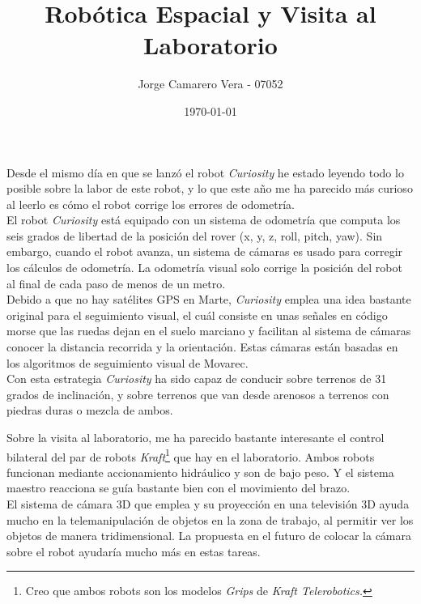 \documentclass[a4paper, fontsize=11pt]{scrartcl} %
\title{	
	\normalfont \normalsize 
	\huge Robótica Espacial y Visita al Laboratorio \\ %
}
\author{Jorge Camarero Vera - 07052} %
\date{\normalsize\today} %
\numberwithin{equation}{section} %
\numberwithin{figure}{section} %
\numberwithin{table}{section} %
\begin{document}
	\maketitle
	
	Desde el mismo día en que se lanzó el robot \textit{Curiosity} he estado leyendo todo lo posible sobre la labor de este robot, y lo que este año me ha parecido más curioso al leerlo es cómo el robot corrige los errores de odometría\cite{CURIOSITY}.\\
	
	El robot \textit{Curiosity} está equipado con un sistema de odometría que computa los seis grados de libertad de la posición del rover (x, y, z, roll, pitch, yaw). Sin embargo, cuando el robot avanza, un sistema de cámaras es usado para corregir los cálculos de odometría. La odometría visual solo corrige la posición del robot al final de cada paso de menos de un metro.\\
	
	Debido a que no hay satélites GPS en Marte, \textit{Curiosity} emplea una idea bastante original para el seguimiento visual, el cuál consiste en unas señales en código morse que las ruedas dejan en el suelo marciano y facilitan al sistema de cámaras conocer la distancia recorrida y la orientación. Estas cámaras están basadas en los algoritmos de seguimiento visual de Movarec\cite{MOVAREC}. \\
	
	Con esta estrategia \textit{Curiosity} ha sido capaz de conducir sobre terrenos de 31 grados de inclinación, y sobre terrenos que van desde arenosos a terrenos con piedras duras o mezcla de ambos.\\
	
	
	\bigskip
	
	Sobre la visita al laboratorio, me ha parecido bastante interesante el control bilateral del par de robots \textit{Kraft}\footnote{Creo que ambos robots son los modelos \textit{Grips} de \textit{Kraft Telerobotics.}} que hay en el laboratorio. Ambos robots funcionan mediante accionamiento hidráulico y son de bajo peso. Y el sistema maestro reacciona se guía bastante bien con el movimiento del brazo.\\
	
	El sistema de cámara 3D que emplea y su proyección en una televisión 3D ayuda mucho en la telemanipulación de objetos en la zona de trabajo, al permitir ver los objetos de manera tridimensional. La propuesta en el futuro de colocar la cámara sobre el robot ayudaría mucho más en estas tareas.\\
	
\end{document}
